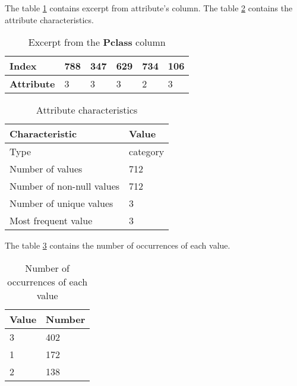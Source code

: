 The table \ref{table:pclass_head} contains excerpt from attribute's column.
The table \ref{table:pclass_characteristics} contains the attribute 
characteristics.

\begin{table}[!ht]
    \centering
    \caption{Excerpt from the \textbf{Pclass} column}
    \begin{tabular}{|l|l|l|l|l|l|}
        \hline
        \textbf{Index}     & 788 & 347 & 629 & 734 & 106 \\ \hline
        \textbf{Attribute} & 3   & 3   & 3   & 2   & 3   \\ \hline
    \end{tabular}
    \label{table:pclass_head}
\end{table}

\begin{table}[!ht]
    \centering
    \caption{Attribute characteristics}
    \begin{tabular}{|l|l|}
        \hline
        \textbf{Characteristic}   & \textbf{Value} \\ \hline
        Type                      & category       \\ \hline
        Number of values          & 712            \\ \hline
        Number of non-null values & 712            \\ \hline
        Number of unique values   & 3              \\ \hline
        Most frequent value       & 3              \\ \hline
    \end{tabular}
    \label{table:pclass_characteristics}
\end{table}

The table \ref{table:pclass_value_counts} contains the number of occurrences of
each value.

\begin{table}[!ht]
    \centering
    \caption{Number of occurrences of each value}
    \begin{tabular}{|l|l|}
        \hline
        \textbf{Value} & \textbf{Number} \\ \hline
        3              & 402             \\ \hline
        1              & 172             \\ \hline
        2              & 138             \\ \hline
    \end{tabular}
    \label{table:pclass_value_counts}
\end{table}

